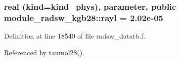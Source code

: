 \subsubsection[{\texorpdfstring{rayl}{rayl}}]{\setlength{\rightskip}{0pt plus 5cm}real (kind=kind\+\_\+phys), parameter, public module\+\_\+radsw\+\_\+kgb28\+::rayl = 2.\+02e-\/05}\hypertarget{namespacemodule__radsw__kgb28_af3641febf88e97741b2cd86a56eda843}{}\label{namespacemodule__radsw__kgb28_af3641febf88e97741b2cd86a56eda843}


Definition at line 18540 of file radsw\+\_\+datatb.\+f.



Referenced by taumol28().


